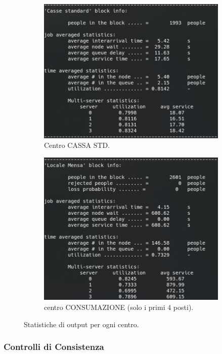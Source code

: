 \documentclass{article}
\begin{document}
\begin{figure}[H]
\begin{subfigure}{.5\textwidth}
  \includegraphics[width=.9\linewidth]{img/migliorativo_1/standard_ext_1.png}
  \caption{Centro CASSA STD.}
  \label{fig:cassa_std_ext_1}
\end{subfigure}
\begin{subfigure}{.5\textwidth}
  \centering
  \includegraphics[width=.9\linewidth]{img/migliorativo_1/consumazione_ext_1.png}
  \caption{centro CONSUMAZIONE (solo i primi 4 posti).}
  \label{fig:consumazione_ext_1}
\end{subfigure}
\caption{Statistiche di output per ogni centro.}
\label{fig:output_ext_1}
\end{figure}

\subsubsection{Controlli di Consistenza}
\end{document}
